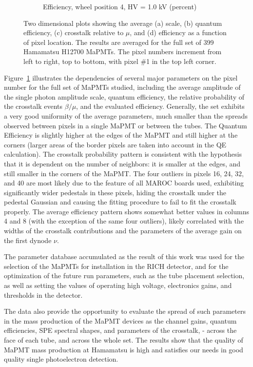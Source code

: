 \begin{figure}[t!]
\begin{subfigure}[c]{0.48\linewidth}
		\caption{Efficiency, wheel position 4, HV = 1.0 kV (percent)}
		\vspace{0mm}
	\end{subfigure}%
	\caption{Two dimensional plots showing the average (a) scale, (b) quantum efficiency, (c) crosstalk relative to $\mu$, and (d) efficiency as a function of pixel location. The results are averaged for the full set of 399 Hamamatsu H12700 MaPMTs. The pixel numbers increment from left to right, top to bottom, with pixel \#1 in the top left corner.}
	\label{fig:2d_avg_fit_results}
\end{figure}


Figure~\ref{fig:2d_avg_fit_results} illustrates the dependencies of several major parameters on the pixel number for the full set of MaPMTs studied, including the average amplitude of the single photon amplitude scale, quantum efficiency, the relative probability of the crosstalk events $\beta/\mu$, and the evaluated efficiency. Generally, the set exhibits a very good uniformity of the average parameters, much smaller than the spreads observed between pixels in a single MaPMT or between the tubes. The Quantum Efficiency is slightly higher at the edges of the MaPMT and still higher at the corners (larger areas of the border pixels are taken into account in the QE calculation). The crosstalk probability pattern is consistent with the hypothesis that it is dependent on the number of neighbors: it is smaller at the edges, and still smaller in the corners of the MaPMT. The four outliers in pixels 16, 24, 32, and 40 are most likely due to the feature of all MAROC boards used, exhibiting significantly wider pedestals in these pixels, hiding the crosstalk under the pedestal Gaussian and causing the fitting procedure to fail to fit the crosstalk properly. The average efficiency pattern shows somewhat better values in columns 4 and 8 (with the exception of the same four outliers), likely correlated with the widths of the crosstalk contributions and the parameters of the average gain on the first dynode $\nu$.    


The parameter database accumulated as the result of this work was used for the selection of the MaPMTs for installation in the RICH detector, and for the optimization of the future run parameters, such as the tube placement selection, as well as setting the values of operating high voltage, electronics gains, and thresholds in the detector.


The data also provide the opportunity to evaluate the spread of such parameters in the mass production of the MaPMT devices as the channel gains, quantum efficiencies, SPE spectral shapes, and parameters of the crosstalk, - across the face of each tube, and across the whole set. The results show that the quality of MaPMT mass production at Hamamatsu is high and satisfies our needs in good quality single photoelectron detection.



